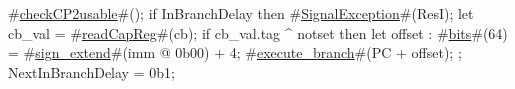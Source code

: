 #\hyperref[sailMIPSzcheckCP2usable]{checkCP2usable}#();
if InBranchDelay then
   #\hyperref[sailMIPSzSignalException]{SignalException}#(ResI);
let cb_val = #\hyperref[sailMIPSzreadCapReg]{readCapReg}#(cb);
if cb_val.tag ^ notset then
{
  let offset : #\hyperref[sailMIPSzbits]{bits}#(64) = #\hyperref[sailMIPSzsignzyextend]{sign\_extend}#(imm @ 0b00) + 4;
  #\hyperref[sailMIPSzexecutezybranch]{execute\_branch}#(PC + offset);
};
NextInBranchDelay = 0b1;

